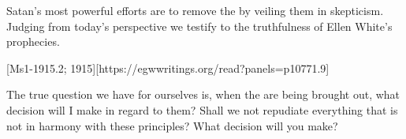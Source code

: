 Satan's most powerful efforts are to remove the  by veiling them in skepticism. Judging from today’s perspective we testify to the truthfulness of Ellen White’s prophecies.

[Ms1-1915.2; 1915][https://egwwritings.org/read?panels=p10771.9]

The true question we have for ourselves is, when the  are being brought out, what decision will I make in regard to them? Shall we not repudiate everything that is not in harmony with these principles? What decision will you make?

